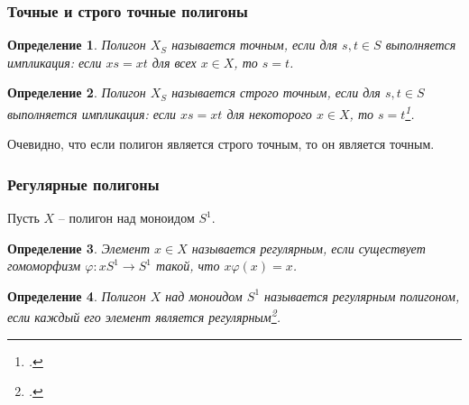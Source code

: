 \documentclass[11pt, notheorems]{beamer}
\newtheorem{definition}{Определение}
\begin{document}
\begin{frame}
	\frametitle{Точные и строго точные полигоны}


	\begin{definition}
		Полигон $X_S$ называется \textit{точным}, если для $s,t \in S$ выполняется импликация: если $xs = xt$ для всех $x \in X$, то $s = t$.
	\end{definition}

	\begin{definition}
		Полигон $X_S$ называется \textit{строго точным}, если для $s, t \in S$ выполняется импликация: если $xs = xt$ для некоторого $x \in X$, то $s = t$\footcite[определение I.4.8]{kilp}.
	\end{definition}

	Очевидно, что если полигон является строго точным, то он является точным.
\end{frame}

\begin{frame}
	\frametitle{Регулярные полигоны}

	Пусть $X$ -- полигон над моноидом $S^1$.

	\begin{definition}
		Элемент $x \in X$ называется \textit{регулярным}, если существует гомоморфизм $\varphi: xS^1 \rightarrow S^1$ такой, что $x \varphi(x) = x$.
	\end{definition}

	\begin{definition}
		Полигон $X$ над моноидом $S^1$ называется \textit{регулярным} полигоном, если каждый его элемент является регулярным\footcite[определение III.19.1]{kilp}.
	\end{definition}
\end{frame}
\end{document}
